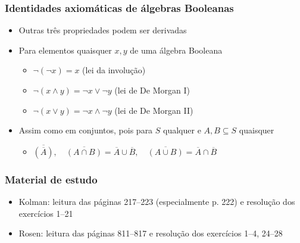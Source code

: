 \documentclass[12pt]{beamer}
\begin{document}
\begin{frame}
  \frametitle{Identidades axiomáticas de álgebras Booleanas}
  \begin{itemize}
    \item<1-> Outras três propriedades podem ser derivadas
    \item<1-> Para elementos quaisquer $x, y$ de uma álgebra Booleana
    \begin{itemize}[itemsep=0pt]
      \item<2-> $\neg (\neg x) = x$ (lei da involução)
      \item<3-> $\neg (x \wedge y) = \neg x \vee \neg y$ (lei de De Morgan I)
      \item<3-> $\neg (x \vee y) = \neg x \wedge \neg y$ (lei de De Morgan II)
    \end{itemize}
    \item<4-> Assim como em conjuntos, pois para $S$ qualquer e $A, B \subseteq
        S$ quaisquer
    \begin{itemize}
      \item $\overline{(\overline{A})}, \quad \overline{(A \cap B)} =
          \overline{A} \cup \overline{B}, \quad \overline{(A \cup B)} =
            \overline{A} \cap \overline{B}$
    \end{itemize}
  \end{itemize}
\end{frame}

\begin{frame}
  \frametitle{Material de estudo}
  
  
  \begin{itemize}[itemsep=0pt]
    \nocite{Kolman:book:1999}
    \item Kolman: leitura das páginas 217--223 (especialmente p. 222) e
        resolução dos exercícios 1--21
    \nocite{Rosen:book:2011}
    \item Rosen: leitura das páginas 811--817 e resolução dos
        exercícios 1--4, 24--28
  \end{itemize}
\end{frame}
\end{document}
